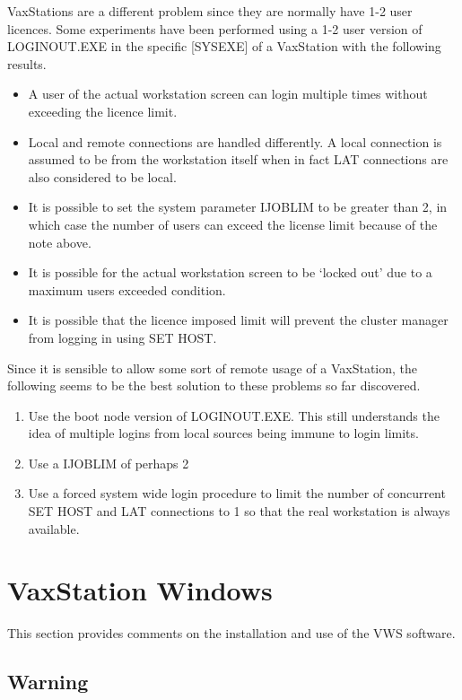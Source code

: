 VaxStations are a different problem since they are normally have 1-2 user
licences.
Some experiments have been performed using a 1-2 user version of LOGINOUT.EXE
in the specific [SYSEXE] of a VaxStation with the following results.
\begin{itemize}
\item A user of the actual workstation screen can login multiple times without
exceeding the licence limit.
\item Local and remote connections are handled differently.
A local connection is assumed to be from the workstation itself when in
fact LAT connections are also considered to be local.
\item It is possible to set the system parameter IJOBLIM to be greater than
2, in which case the number of users can exceed the license limit because of the
note above.
\item It is possible for the actual workstation screen to be `locked out'
due to a maximum users exceeded condition.
\item It is possible that the licence imposed limit will prevent the cluster
manager from logging in using SET HOST.
\end{itemize}

Since it is sensible to allow some sort of remote usage of a VaxStation,
the following seems to be the best solution to these problems so far discovered.
\begin{enumerate}
\item Use the boot node version of LOGINOUT.EXE.
This still understands the idea of multiple logins from local sources being
immune to login limits.
\item Use a IJOBLIM of perhaps 2
\item Use a forced system wide login procedure to limit the number of
concurrent SET HOST and LAT connections to 1 so that the real workstation is
always available.
\end{enumerate}

\section {VaxStation Windows}

\label{windows}
This section provides comments on the installation and use of the VWS software.

\subsection {Warning}

